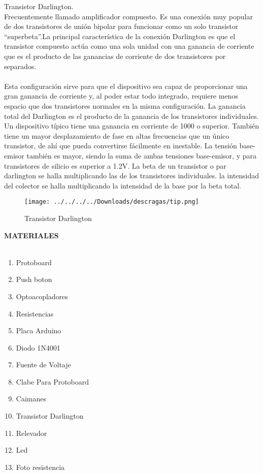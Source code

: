 \documentclass[12pt]{report}
\begin{document}
{\large Transistor Darlington.\\ Frecuentemente llamado amplificador compuesto. Es una conexión muy popular de dos transistores de unión bipolar para funcionar como un solo transistor “superbeta”.La principal característica de la conexión Darlington es que el transistor compuesto actúa como una sola unidad con una ganancia de corriente que es el producto de las ganancias de corriente de dos transistores por separados.\\\\Esta configuración sirve para que el dispositivo sea capaz de proporcionar una gran ganancia de corriente y, al poder estar todo integrado, requiere menos espacio que dos transistores normales en la misma configuración. La ganancia total del Darlington es el producto de la ganancia de los transistores individuales.
\\
Un dispositivo típico tiene una ganancia en corriente de 1000 o superior. También tiene un mayor desplazamiento de fase en altas frecuencias que un único transistor, de ahí que pueda convertirse fácilmente en inestable. La tensión base-emisor también es mayor, siendo la suma de ambas tensiones base-emisor, y para transistores de silicio es superior a 1.2V. La beta de un transistor o par darlington se halla multiplicando las de los transistores individuales. la intensidad del colector se halla multiplicando la intensidad de la base por la beta total.}
\begin{flushright}
\begin{figure}[hbtp]
\centering
\texttt{[image: ../../../../Downloads/descragas/tip.png]}
\caption{Transistor Darlington}
\end{figure}

\end{flushright}
\newpage

{\huge \textbf{MATERIALES}\\}\\


\begin{enumerate}
\item Protoboard
\item Push boton
\item Optoacopladores
\item Resistencias
\item Placa Arduino
\item Diodo 1N4001
\item Fuente de Voltaje
\item Clabe Para Protoboard
\item Caimanes
\item Transistor Darlington
\item Relevador
\item Led
\item Foto resistencia  
\end{enumerate}
\end{document}
